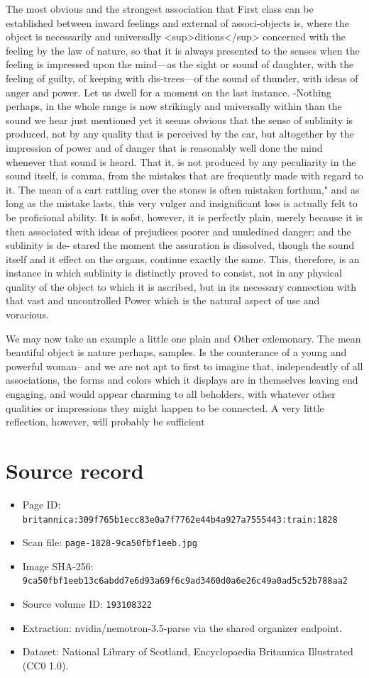 \documentclass{article}
\begin{document}
The most obvious and the strongest association that First class can be established between inward feelings and external of associ-objects is, where the object is necessarily and universally <sup>ditions</sup> concerned with the feeling by the law of nature, so that it is always presented to the senses when the feeling is impressed upon the mind—as the sight or sound of daughter, with the feeling of guilty, of keeping with dis-trees—of the sound of thunder, with ideas of anger and power. Let us dwell for a moment on the last instance. -Nothing perhaps, in the whole range is now strikingly and universally within than the sound we hear just mentioned yet it seems obvious that the sense of sublinity is produced, not by any quality that is perceived by the car, but altogether by the impression of power and of danger that is reasonably well done the mind whenever that sound is heard. That it, is not produced by any peculiarity in the sound itself, is comma, from the mistakes that are frequently made with regard to it. The mean of a cart rattling over the stones is often mistaken forthum," and as long as the mistake lasts, this very vulger and insignificant loss is actually felt to be proficional ability. It is sofst, however, it is perfectly plain, merely because it is then associated with ideas of prejudices poorer and unuledined danger; and the sublinity is de- stared the moment the assuration is dissolved, though the sound itself and it effect on the organs, continue exactly the same. This, therefore, is an instance in which sublinity is distinctly proved to consist, not in any physical quality of the object to which it is ascribed, but in its necessary connection with that vast and uncontrolled Power which is the natural aspect of use and voracious.

We may now take an example a little one plain and Other exlemonary. The mean beautiful object is nature perhaps, samples. Is the counterance of a young and powerful woman-- and we are not apt to first to imagine that, independently of all associations, the forms and colors which it displays are in themselves leaving end engaging, and would appear charming to all beholders, with whatever other qualities or impressions they might happen to be connected. A very little reflection, however, will probably be sufficient

\section*{Source record}
\begin{itemize}
\item Page ID: \texttt{britannica:309f765b1ecc83e0a7f7762e44b4a927a7555443:train:1828}
\item Scan file: \texttt{page-1828-9ca50fbf1eeb.jpg}
\item Image SHA-256: \texttt{9ca50fbf1eeb13c6abdd7e6d93a69f6c9ad3460d0a6e26c49a0ad5c52b788aa2}
\item Source volume ID: \texttt{193108322}
\item Extraction: nvidia/nemotron-3.5-parse via the shared organizer endpoint.
\item Dataset: National Library of Scotland, Encyclopaedia Britannica Illustrated (CC0 1.0).
\end{itemize}
\end{document}
